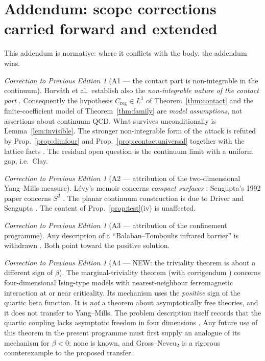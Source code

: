 \documentclass[11pt,a4paper]{article}
\theoremstyle{plain}
\theoremstyle{definition}
\theoremstyle{remark}
\newtheorem{correction}[theorem]{Correction to Previous Edition}
\renewcommand{\_}{\oldunderscore\allowbreak}
\begin{document}
\section{Addendum: scope corrections carried forward and extended}\label{app:addendum}
This addendum is normative: where it conflicts with the body, the addendum wins.
\begin{correction}[A1 --- the contact part is non-integrable in the continuum]
\label{corr:nonintegrable}
Horv\'ath et al.\ establish also the \emph{non-integrable nature of the contact part}
\cite{Horvath2005}. Consequently the hypothesis $C_{\mathrm{reg}}\in L^1$ of
Theorem~\ref{thm:contact} and the finite-coefficient model of Theorem~\ref{thm:family} are
\emph{model assumptions}, not assertions about continuum QCD. What survives unconditionally is
Lemma~\ref{lem:invisible}. The stronger non-integrable form of the attack is refuted by
Prop.~\ref{prop:dimfour} and Prop.~\ref{prop:contactuniversal} together with the lattice facts
\cite{Bietenholz2018,Ce2015}. The residual open question is the continuum limit with a uniform
gap, i.e.\ Clay.
\end{correction}
\begin{correction}[A2 --- attribution of the two-dimensional Yang--Mills measure]\label{corr:2dym}
L\'evy's memoir concerns \emph{compact surfaces} \cite{Levy2003}; Sengupta's 1992 paper concerns
$S^2$ \cite{Sengupta1992}. The planar continuum construction is due to Driver and Sengupta
\cite{SenguptaReview,AnshelevichSengupta2012}. The content of Prop.~\ref{prop:test}(iv) is
unaffected.
\end{correction}
\begin{correction}[A3 --- attribution of the confinement programme]\label{corr:tomboulis}
Any description of a ``Balaban--Tomboulis infrared barrier'' is withdrawn
\cite{Tomboulis1983,Tomboulis2007,Balaban1987}. Both point toward the positive solution.
\end{correction}
\begin{correction}[A4 --- NEW: the triviality theorem is about a different sign of
\texorpdfstring{$\beta$}{beta}]\label{corr:adc}
The marginal-triviality theorem \cite{ADC2021} (with corrigendum \cite{ADC2024}) concerns
four-dimensional Ising-type models with nearest-neighbour ferromagnetic interaction at or near
criticality. Its mechanism uses the \emph{positive} sign of the quartic beta function. It is
\emph{not} a theorem about asymptotically free theories, and it does not transfer to Yang--Mills.
The problem description itself records that the quartic coupling lacks asymptotic freedom in
four dimensions \cite{JaffeWitten2000}. Any future use of this theorem in the present programme
must first supply an analogue of its mechanism for $\beta<0$; none is known, and
Gross--Neveu$_2$ \cite{FMRS1986,GK1985} is a rigorous counterexample to the proposed transfer.
\end{correction}
\end{document}
